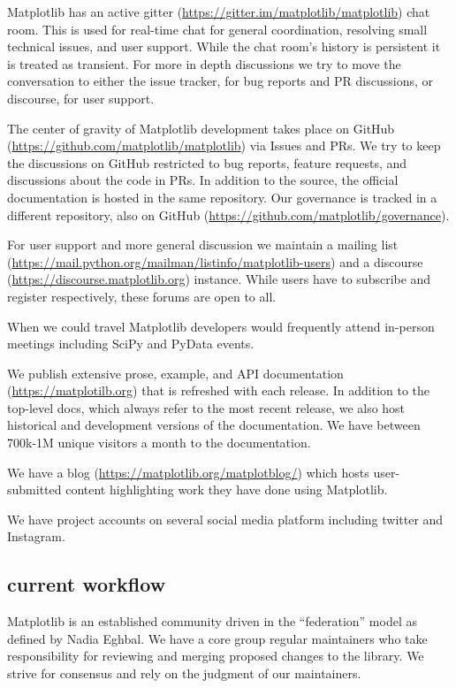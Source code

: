\documentclass[12pt]{article}
\numberwithin{page}{section}
\begin{document}
Matplotlib has an active
gitter (\url{https://gitter.im/matplotlib/matplotlib}) chat
room.  This is used for real-time chat for general coordination,
resolving small technical issues, and user support.  While the chat
room's history is persistent it is treated as transient.  For more in
depth discussions we try to move the conversation to either the issue
tracker, for bug reports and PR discussions, or discourse, for user
support.

The center of gravity of Matplotlib development takes place on
GitHub (\url{https://github.com/matplotlib/matplotlib}) via
Issues and PRs.  We try to keep the discussions on GitHub restricted
to bug reports, feature requests, and discussions about the code in
PRs.  In addition to the source, the official documentation is hosted
in the same repository.  Our governance is tracked in a different
repository, also on
GitHub (\url{https://github.com/matplotlib/governance}).

For user support and more general discussion we maintain a mailing
list (\url{https://mail.python.org/mailman/listinfo/matplotlib-users})
and a discourse (\url{https://discourse.matplotlib.org})
instance.  While users have to subscribe and register respectively,
these forums are open to all.

When we could travel Matplotlib developers would frequently attend
in-person meetings including SciPy and PyData events.

We publish extensive prose, example, and API
documentation (\url{https://matplotilb.org}) that is
refreshed with each release.  In addition to the top-level docs, which
always refer to the most recent release, we also host historical and
development versions of the documentation.  We have between 700k-1M
unique visitors a month to the documentation.

We have a blog (\url{https://matplotlib.org/matplotblog/})
which hosts user-submitted content highlighting work they have done
using Matplotlib.

We have project accounts on several social media platform including
twitter and Instagram.


\subsection{current workflow}

Matplotlib is an established community driven in the ``federation''
model as defined by Nadia Eghbal\cite{eghbal_2020}.  We have a core
group regular maintainers who take responsibility for reviewing and
merging proposed changes to the library.  We strive for consensus and
rely on the judgment of our maintainers.
\end{document}
